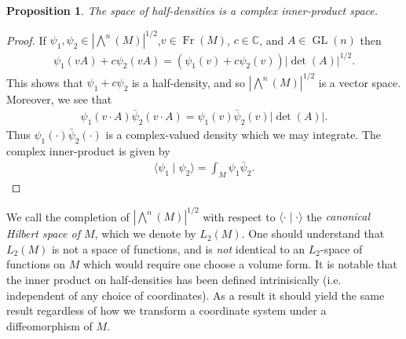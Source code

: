 \documentclass[12pt]{amsart}
\newtheorem{prop}{Proposition}
\DeclareMathOperator{\GL}{GL}
\DeclareMathOperator{\Fr}{Fr}
\begin{document}
\begin{prop}
  The space of half-densities is a complex inner-product space.
\end{prop}
\begin{proof}
 If $\psi_1,\psi_2 \in |\bigwedge^n(M)|^{1/2}$,$v \in \Fr(M)$, $c \in \mathbb{C}$, and $A \in \GL(n)$ then
  \begin{align*}
    \psi_1( v A) + c  \psi_2(v A) = ( \psi_1(v) + c\psi_2(v) ) | \det(A) |^{1/2}.
  \end{align*}
  This shows that $\psi_1 + c \psi_2$ is a half-density, and so $|\bigwedge^n(M)|^{1/2}$ is a vector space.
  Moreover, we see that
  \begin{align*}
    \psi_1(v \cdot A) \bar{\psi}_2( v \cdot A) = \psi_1(v)\bar{\psi}_2(v) | \det(A) |.
  \end{align*}
  Thus $\psi_1( \cdot) \bar{\psi}_2( \cdot)$ is a complex-valued density which we may integrate.  The complex inner-product is given by
  \begin{align*}
    \langle \psi_1 \mid \psi_2 \rangle = \int_M \psi_1 \bar{\psi}_2.
  \end{align*}
\end{proof}

  We call the completion of $| \bigwedge^n(M) |^{1/2}$ with respect to $\langle \cdot \mid \cdot \rangle$ the \emph{canonical Hilbert space of $M$}, which we denote by $L_2(M)$.
One should understand that $L_2(M)$ is not a space of functions, and is \emph{not} identical to an $L_2$-space of functions on $M$ which would require one choose a volume form.
It is notable that the inner product on half-densities has been defined intrinisically (i.e. independent of any choice of coordinates).  As a result it should yield the same result regardless of how we transform a coordinate system under a diffeomorphism of $M$.
\end{document}
